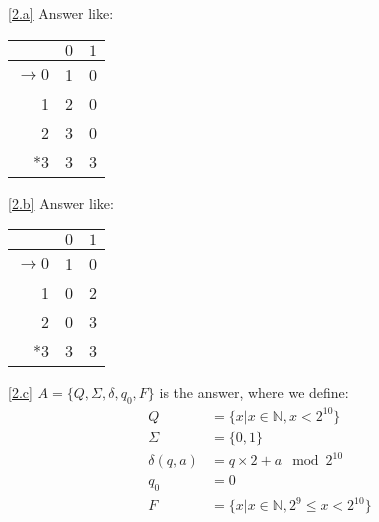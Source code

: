 \documentclass[10pt]{homework}
\begin{document}
\begin{solution}

  \ref{2.a} %
  Answer like:
  \begin{table}[h]
    \centering
    \begin{tabular}{r||c|c} %
      & $0$ & $1$\\\hline\hline  %
      $\rightarrow 0$ & 1 & 0\\
      1 & 2 & 0\\
      2 & 3 & 0\\
      *3 & 3 & 3
    \end{tabular}
  \end{table}

  \ref{2.b} %
  Answer like:
  \begin{table}[h]
    \centering
    \begin{tabular}{r||c|c} %
      & $0$ & $1$\\\hline\hline  %
      $\rightarrow 0$ & 1 & 0\\
      1 & 0 & 2\\
      2 & 0 & 3\\
      *3 & 3 & 3
    \end{tabular}
  \end{table}

  \ref{2.c} %
  $A=\{Q,\Sigma,\delta,q_0,F\}$ is the answer, where we define:
  \begin{align}
      Q&=\{x|x\in \mathbb{N},x<2^{10}\}\\
      \Sigma&=\{0,1\}\\
      \delta(q,a)&=q\times 2+a \mod 2^{10}\\
      q_0&=0\\
      F&=\{x|x\in \mathbb{N},2^{9}\le x<2^{10}\}
  \end{align}
  


\end{solution}
\end{document}
